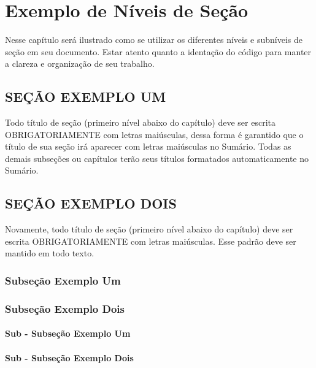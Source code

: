 \documentclass[
  12pt,		%
  a4paper,	%
  openright,%
  oneside,	%
  chapter=TITLE,		%
  section=TITLE,		%
  english,	%
  french,	%
  spanish,	%
  brazil	%
]{abntex2}
\begin{document}
    \chapter {Exemplo de Níveis de Seção}
    
        Nesse capítulo será ilustrado como se utilizar os diferentes níveis e subníveis de seção em seu documento. Estar atento quanto a identação do código para manter a clareza e organização de seu trabalho.
        
            \section{SEÇÃO EXEMPLO UM}
            Todo título de seção (primeiro nível abaixo do capítulo) deve ser escrita OBRIGATORIAMENTE com letras maiúsculas, dessa forma é garantido que o título de sua seção irá aparecer com letras maiúsculas no Sumário. Todas as demais subseções ou capítulos terão seus títulos formatados automaticamente no Sumário.
            
            \section{SEÇÃO EXEMPLO DOIS}
            Novamente, todo título de seção (primeiro nível abaixo do capítulo) deve ser escrita OBRIGATORIAMENTE com letras maiúsculas. Esse padrão deve ser mantido em todo texto.
            
                \subsection{Subseção Exemplo Um}
                \lipsum[8]
                
                \subsection{Subseção Exemplo Dois}
                \lipsum[7]
                
                    \subsubsection{Sub - Subseção Exemplo Um}
                    \lipsum[6]
                    
                    \subsubsection{Sub - Subseção Exemplo Dois}
                    \lipsum[12]
                    
\end{document}
